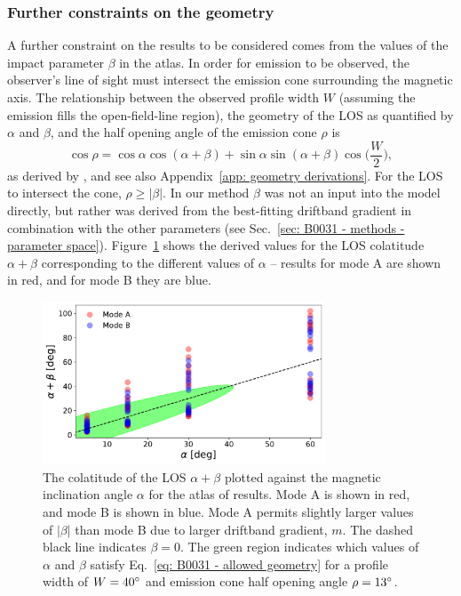 \subsubsection{Further constraints on the geometry}
\label{sec: B0031 - discuss - atlas - beta constraint}

A further constraint on the results to be considered comes from the values of the impact parameter $\beta$ in the atlas. In order for emission to be observed, the observer's line of sight must intersect the emission cone surrounding the magnetic axis. The relationship between the observed profile width $W$ (assuming the emission fills the open-field-line region), the geometry of the LOS as quantified by $\alpha$ and $\beta$, and the half opening angle of the emission cone $\rho$ is
\begin{equation}
    \label{eq: B0031 - allowed geometry}
    \cos\rho = \cos\alpha\cos(\alpha+\beta)+\sin\alpha\sin(\alpha+\beta)\cos\bigg(\frac{W}{2}\bigg),
\end{equation}
as derived by \citet{GGRx1984}, and see also Appendix~\ref{app: geometry derivations}. For the LOS to intersect the cone, $\rho \geq |\beta|$. In our method $\beta$ was not an input into the model directly, but rather was derived from the best-fitting driftband gradient in combination with the other parameters (see Sec.~\ref{sec: B0031 - methods - parameter space}). Figure~\ref{fig: B0031 - atlas alpha vs beta} shows the derived values for the LOS colatitude $\alpha + \beta$ corresponding to the different values of $\alpha$ -- results for mode A are shown in red, and for mode B they are blue.
\begin{figure}
    \begin{center}
        \includegraphics[width=0.75\textwidth]{Figures/B0031/alpha_zeta_distribution}
        \caption[Distribution of $\alpha$ and $\beta$ in the atlas of results]{The colatitude of the LOS $\alpha + \beta$ plotted against the magnetic inclination angle $\alpha$ for the atlas of results. Mode A is shown in red, and mode B is shown in blue. Mode A permits slightly larger values of $|\beta|$ than mode B due to larger driftband gradient, $m$. The dashed black line indicates $\beta = 0$. The green region indicates which values of $\alpha$ and $\beta$ satisfy Eq.~\eqref{eq: B0031 - allowed geometry} for a profile width of $W = 40^\circ$ and emission cone half opening angle $\rho = 13^\circ$.}
        \label{fig: B0031 - atlas alpha vs beta}     
    \end{center}
\end{figure}
